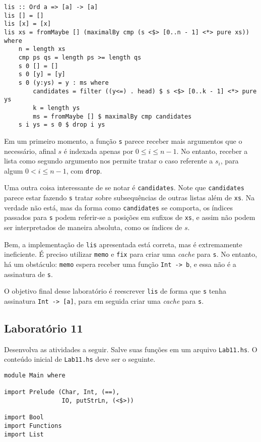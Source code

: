 \documentclass[a4paper]{article}
\begin{document}
\pagebreak

\begin{verbatim}
lis :: Ord a => [a] -> [a]
lis [] = []
lis [x] = [x]
lis xs = fromMaybe [] (maximalBy cmp (s <$> [0..n - 1] <*> pure xs)) where
	n = length xs
	cmp ps qs = length ps >= length qs
	s 0 [] = []
	s 0 [y] = [y]
	s 0 (y:ys) = y : ms where
		candidates = filter ((y<=) . head) $ s <$> [0..k - 1] <*> pure ys
		k = length ys
		ms = fromMaybe [] $ maximalBy cmp candidates
	s i ys = s 0 $ drop i ys
\end{verbatim}

Em um primeiro momento, a função \texttt{s} parece receber mais argumentos que o necessário, afinal $s$ é indexada apenas por $0 \leq i \leq n - 1$.
No entanto, receber a lista como segundo argumento nos permite tratar o caso referente a $s_i$, para algum $0 < i \leq n - 1$, com \texttt{drop}.

Uma outra coisa interessante de se notar é \texttt{candidates}.
Note que \texttt{candidates} parece estar fazendo \texttt{s} tratar sobre subsequências de outras listas além de \texttt{xs}.
Na verdade não está, mas da forma como \texttt{candidates} se comporta, os índices passados para \texttt{s} podem referir-se a posições em sufixos de \texttt{xs}, e assim não podem ser interpretados de maneira absoluta, como os índices de $s$.

Bem, a implementação de \texttt{lis} apresentada está correta, mas é extremamente ineficiente.
É preciso utilizar \texttt{memo} e \texttt{fix} para criar uma \emph{cache} para \texttt{s}.
No entanto, há um obstáculo: \texttt{memo} espera receber uma função \texttt{Int -> b}, e essa não é a assinatura de \texttt{s}.

O objetivo final desse laboratório é reescrever \texttt{lis} de forma que \texttt{s} tenha assinatura \mbox{\texttt{Int -> [a]}}, para em seguida criar uma \emph{cache} para \texttt{s}.

\subsection{Laboratório 11}

Desenvolva as atividades a seguir.
Salve suas funções em um arquivo \texttt{Lab11.hs}.
O conteúdo inicial de \texttt{Lab11.hs} deve ser o seguinte.

\begin{verbatim}
module Main where

import Prelude (Char, Int, (==),
                IO, putStrLn, (<$>))

import Bool
import Functions
import List
\end{verbatim}
\end{document}
